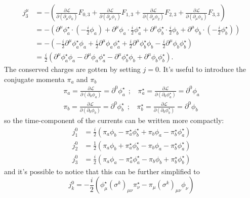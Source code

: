    \[
   \begin{aligned}
   j^\mu_3 &= -\left( \frac{\partial \mathcal{L}}{\partial (\partial_\mu \phi_0)} F_{0,3} + \frac{\partial \mathcal{L}}{\partial (\partial_\mu \phi_1)} F_{1,3} + \frac{\partial \mathcal{L}}{\partial (\partial_\mu \phi_2)} F_{2,3} + \frac{\partial \mathcal{L}}{\partial (\partial_\mu \phi_3)} F_{3,3} \right) \\
   &= -\left( \partial^\mu \phi_a^\star \cdot \left( -\frac{i}{2} \phi_a \right) + \partial^\mu \phi_a \cdot \frac{i}{2} \phi_a^\star + \partial^\mu \phi_b^\star \cdot \frac{i}{2} \phi_b + \partial^\mu \phi_b \cdot \left( -\frac{i}{2} \phi_b^\star \right) \right) \\
   &= -\left( -\frac{i}{2} \partial^\mu \phi_a^\star \phi_a + \frac{i}{2} \partial^\mu \phi_a \phi_a^\star + \frac{i}{2} \partial^\mu \phi_b^\star \phi_b - \frac{i}{2} \partial^\mu \phi_b \phi_b^\star \right) \\
   &= \frac{i}{2} \left( \partial^\mu \phi_a^\star \phi_a - \partial^\mu \phi_a \phi_a^\star - \partial^\mu \phi_b^\star \phi_b + \partial^\mu \phi_b \phi_b^\star \right).
   \end{aligned}
   \]
The conserved charges are gotten by setting $j=0$. It's useful to introduce the conjugate momenta $\pi_a$ and $\pi_b$
\begin{align*} \pi_a = \frac{\partial \mathcal L}{\partial(\partial_0 \phi_a)}= \partial^0 \phi_a^\star~~;~~~~
    \pi_a^\star = \frac{\partial \mathcal L}{\partial(\partial_0 \phi_a^\star)}= \partial^0 \phi_a  \\
       \pi_b =  \frac{\partial \mathcal L}{\partial(\partial_0 \phi_b)}= \partial^0 \phi_b^\star~~;~~~~
   \pi_b^\star =  \frac{\partial \mathcal L}{\partial(\partial_0 \phi_b^\star)}= \partial^0 \phi_b
\end{align*}
so the time-component of the currents can be written more compactly:
\begin{align*}
j^0_1 &= \frac{i}{2} \left( \pi_a \phi_b - \pi_a^\star \phi_b^\star + \pi_b \phi_a - \pi_b^\star \phi_a^\star \right)\\ 
j^0_2 &= \frac{1}{2} \left( \pi_a \phi_b + \pi_a^\star \phi_b^\star - \pi_b \phi_a - \pi_b^\star \phi_a^\star \right)\\
j^0_3 &= \frac{i}{2} \left( \pi_a \phi_a - \pi_a^\star \phi_a^\star - \pi_b \phi_b + \pi_b^\star \phi_b^\star \right)
\end{align*}
and it's possible to notice that this can be further simplified to 
\[
j_k^0 = -\frac{i}{2} ( \phi^\star _\mu (\sigma^k)_{\mu\nu} \pi_\nu^\star - \pi_\mu(\sigma^k)_{\mu\nu}\phi_\nu )
\]

